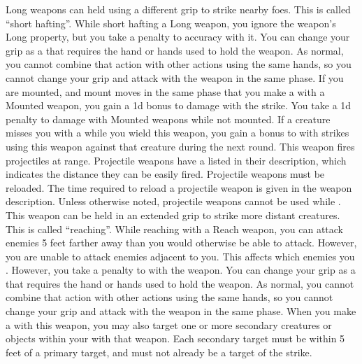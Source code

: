             Long weapons can held using a different grip to strike nearby foes.
            This is called ``short hafting''.
            While short hafting a Long weapon, you ignore the weapon's Long property, but you take a  penalty to accuracy with it.
            You can change your grip as a  that requires the hand or hands used to hold the weapon.
            As normal, you cannot combine that action with other actions using the same hands, so you cannot change your grip and attack with the weapon in the same phase.
            \label{Mounted Weapon} If you are mounted, and mount moves in the same phase that you make a  with a Mounted weapon, you gain a \plus1d bonus to damage with the strike.
            You take a \minus1d penalty to damage with Mounted weapons while not mounted.
             If a creature misses you with a  while you wield this weapon, you gain a  bonus to  with strikes using this weapon against that creature during the next round.
             This weapon fires projectiles at range. Projectile weapons have a  listed in their description, which indicates the distance they can be easily fired. Projectile weapons must be reloaded. The time required to reload a projectile weapon is given in the weapon description.
            Unless otherwise noted, projectile weapons cannot be used while \prone.
            \label{Reach Weapon} This weapon can be held in an extended grip to strike more distant creatures.
            This is called ``reaching''.
            While reaching with a Reach weapon, you can attack enemies 5 feet farther away than you would otherwise be able to attack.
            However, you are unable to attack enemies adjacent to you.
            This affects which enemies you .
            However, you take a  penalty to  with the weapon.
            You can change your grip as a  that requires the hand or hands used to hold the weapon.
            As normal, you cannot combine that action with other actions using the same hands, so you cannot change your grip and attack with the weapon in the same phase.
            \label{Sweeping} When you make a  with this weapon, you may also target one or more secondary creatures or objects within your  with that weapon.
            Each secondary target must be within 5 feet of a primary target, and must not already be a target of the strike.
